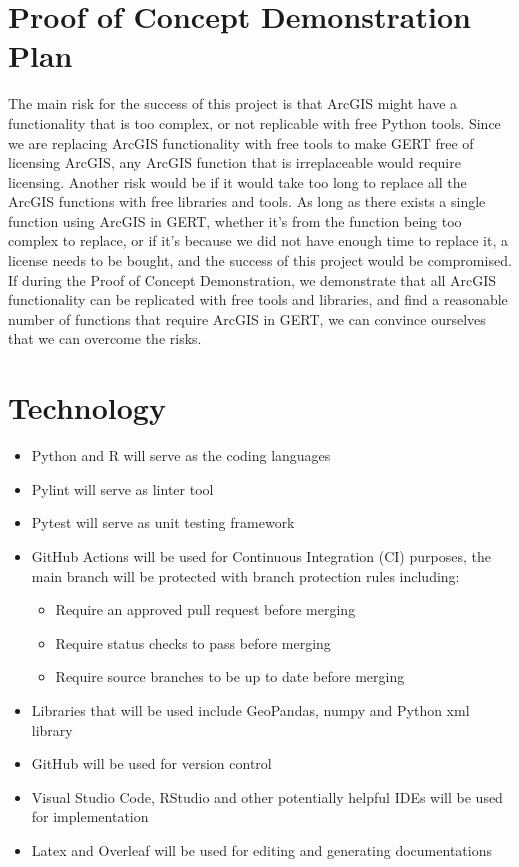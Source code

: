 \documentclass{article}
\begin{document}
\section{Proof of Concept Demonstration Plan}

The main risk for the success of this project is that ArcGIS might have a functionality that is too complex, or not replicable with free Python tools. Since we are replacing ArcGIS functionality with free tools to make GERT free of licensing ArcGIS, any ArcGIS function that is irreplaceable would require licensing. Another risk would be if it would take too long to replace all the ArcGIS functions with free libraries and tools. As long as there exists a single function using ArcGIS in GERT, whether it's from the function being too complex to replace, or if it's because we did not have enough time to replace it, a license needs to be bought, and the success of this project would be compromised. If during the Proof of Concept Demonstration, we demonstrate that all ArcGIS functionality can be replicated with free tools and libraries, and find a reasonable number of functions that require ArcGIS in GERT, we can convince ourselves that we can overcome the risks.

\section{Technology}

\begin{itemize}
\item Python and R will serve as the coding languages
\item Pylint will serve as linter tool
\item Pytest will serve as unit testing framework
\item GitHub Actions will be used for Continuous Integration (CI) purposes, the main branch will be protected with branch protection rules including:
    \begin{itemize}
        \item Require an approved pull request before merging
        \item Require status checks to pass before merging
        \item Require source branches to be up to date before merging
    \end{itemize}
\item Libraries that will be used include GeoPandas, numpy and Python xml library 
\item GitHub will be used for version control 
\item Visual Studio Code, RStudio and other potentially helpful IDEs will be used for implementation
\item Latex and Overleaf will be used for editing and generating documentations
\end{itemize}
\end{document}
